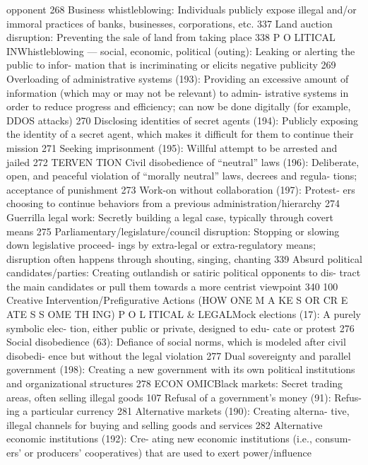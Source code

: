 \documentclass[twoside,a4paper,12pt,fleqn,openany]{extbook}
\begin{document}
opponent
 268
Business whistleblowing: Individuals publicly
expose illegal and/or immoral practices of
banks, businesses, corporations, etc.
 337
Land auction disruption: Preventing the sale
of land from taking place
 338
P O LITICAL INWhistleblowing — social, economic, political
(outing): Leaking or alerting the public to infor-
mation that is incriminating or elicits negative
publicity
 269
Overloading of administrative systems (193):
Providing an excessive amount of information
(which may or may not be relevant) to admin-
istrative systems in order to reduce progress
and efficiency; can now be done digitally (for
example, DDOS attacks)
 270
Disclosing identities of secret agents (194):
Publicly exposing the identity of a secret agent,
which makes it difficult for them to continue
their mission
 271
Seeking imprisonment (195): Willful attempt
to be arrested and jailed
 272
TERVEN TION
Civil disobedience of “neutral” laws (196):
Deliberate, open, and peaceful violation of
“morally neutral” laws, decrees and regula-
tions; acceptance of punishment
 273
Work-on without collaboration (197): Protest-
ers choosing to continue behaviors from a
previous administration/hierarchy
 274
Guerrilla legal work: Secretly building a legal
case, typically through covert means
 275
Parliamentary/legislature/council disruption:
Stopping or slowing down legislative proceed-
ings by extra-legal or extra-regulatory means;
disruption often happens through shouting,
singing, chanting
 339
Absurd political candidates/parties: Creating
outlandish or satiric political opponents to dis-
tract the main candidates or pull them towards
a more centrist viewpoint
 340
100
Creative Intervention/Prefigurative Actions
(HOW ONE M A KE S OR CR E ATE S S OME TH ING)
P O L ITICAL & LEGALMock elections (17): A purely symbolic elec-
tion, either public or private, designed to edu-
cate or protest
 276
Social disobedience (63): Defiance of social
norms, which is modeled after civil disobedi-
ence but without the legal violation
 277
Dual sovereignty and parallel government
(198): Creating a new government with its
own political institutions and organizational
structures
 278
ECON OMICBlack markets: Secret trading areas, often
selling illegal goods
 107
Refusal of a government’s money (91): Refus-
ing a particular currency
 281
Alternative markets (190): Creating alterna-
tive, illegal channels for buying and selling
goods and services
 282
Alternative economic institutions (192): Cre-
ating new economic institutions (i.e., consum-
ers’ or producers’ cooperatives) that are used
to exert power/influence
\end{document}
